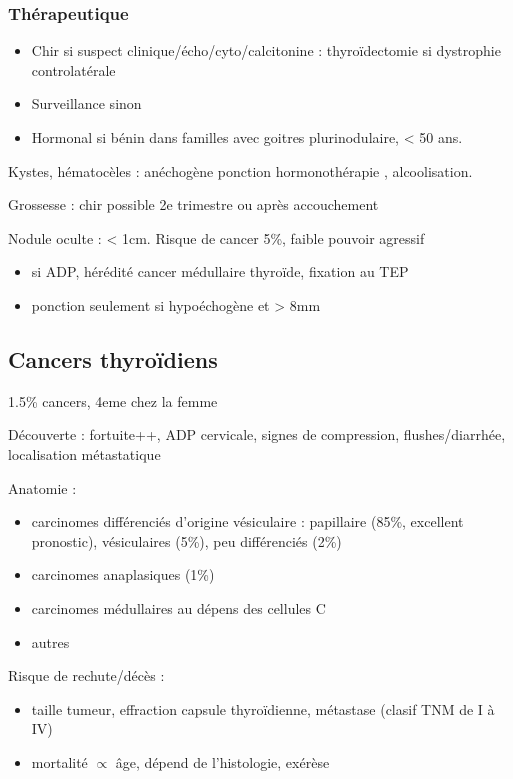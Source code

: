 \documentclass{book}
\begin{document}
\subsubsection{Thérapeutique}
\label{sec:orgb06fb78}
\begin{itemize}
\item Chir si suspect clinique/écho/cyto/calcitonine \inc\inc{} : thyroïdectomie si dystrophie controlatérale
\item Surveillance sinon
\item Hormonal si bénin dans familles avec goitres plurinodulaire, < 50 ans.
\end{itemize}

Kystes, hématocèles : anéchogène \thus ponction \textpm{} hormonothérapie , alcoolisation.

Grossesse : chir possible 2e trimestre ou après accouchement 

Nodule oculte : < 1cm. Risque de cancer 5\%, faible pouvoir agressif
\begin{itemize}
\item \danger si ADP, hérédité cancer médullaire thyroïde, fixation au TEP
\item ponction seulement si hypoéchogène et > 8mm
\end{itemize}
\subsection{Cancers thyroïdiens}
\label{sec:orgeb761b9}
1.5\% cancers, 4eme chez la femme

Découverte : fortuite++, ADP cervicale, signes de compression, flushes/diarrhée,
localisation métastatique

Anatomie :
\begin{itemize}
\item carcinomes différenciés d'origine vésiculaire : papillaire (85\%, excellent
pronostic), vésiculaires (5\%), peu différenciés (2\%)
\item carcinomes anaplasiques (1\%)
\item carcinomes médullaires au dépens des cellules C
\item autres
\end{itemize}

Risque de rechute/décès : 
\begin{itemize}
\item taille tumeur, effraction capsule thyroïdienne, métastase (clasif TNM de I à IV)
\item mortalité \(\propto\) âge, dépend de l'histologie, exérèse
\end{itemize}
\end{document}
